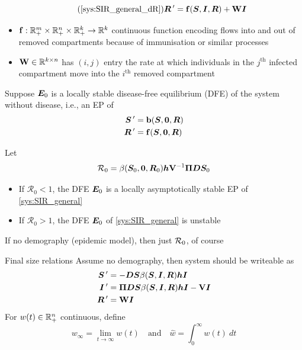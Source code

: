\documentclass[aspectratio=169]{beamer}\usepackage[]{graphicx}\usepackage[]{xcolor}
\begin{document}
\begin{frame}
\begin{equation}\tag{\ref{sys:SIR_general_dR}}
\bR\pprime = \mathbf{f}(\bS,\bI,\bR)+\mathbf{W}\bI
\end{equation}
\begin{itemize}
\item $\mathbf{f}:\mathbb{R}_+^m\times\mathbb{R}_+^n\times\mathbb{R}_+^k\to \mathbb{R}^k$ continuous function encoding flows into and out of removed compartments because of immunisation or similar processes
\item $\mathbf{W}\in\mathbb{R}^{k\times n}$ has $(i,j)$ entry the rate at which individuals in the $j^{\textrm{th}}$ infected compartment move into the $i^{\textrm{th}}$ removed compartment
\end{itemize}
\end{frame}



\begin{frame}
Suppose $\bm{E}_0$ is a locally stable disease-free equilibrium (DFE) of the system without disease, i.e., an EP of
\begin{align*}
\bS\pprime &= \mathbf{b}(\bS,\b0,\bR) \\
\bR\pprime &= \mathbf{f}(\bS,\b0,\bR) \\
\end{align*}

\begin{theorem}
Let
\begin{equation}\label{eq:R0_final_size_method}
\mathcal{R}_0 = 
\beta(\bS_0,\b0,\bR_0)
\bh\mathbf{V}^{-1}
\bPi\bD\bS_0
\end{equation}
\begin{itemize}
\item If $\mathcal{R}_0<1$, the DFE $\bm{E}_0$ is a locally asymptotically stable EP of \eqref{sys:SIR_general}
\item If $\mathcal{R}_0>1$, the DFE $\bm{E}_0$ of \eqref{sys:SIR_general} is unstable
\end{itemize}
\end{theorem}
\vfill
If no demography (epidemic model), then just $\mathcal{R}_0$, of course
\end{frame}  

\begin{frame}{Final size relations}
Assume no demography, then system should be writeable as
\begin{subequations}
\begin{align}
\bm{S}\,' &= -\bm{D}\bm{S}\beta(\bm{S},\bm{I},\bm{R})\bm{h}\bm{I}  \label{sys:SIR_epi_dS} \\
\bm{I}\,' &= \bm{\Pi}\bm{D}\bm{S}\beta(\bm{S},\bm{I},\bm{R})\bm{h}\bm{I}-\mathbf{V}\bm{I} 
\label{sys:SIR_epi_dI} \\
\bm{R}\,' &= \mathbf{W}\bm{I}
\label{sys:SIR_epi_dR} 
\end{align}
\end{subequations}
\vfill
For $w(t)\in\mathbb{R}_+^n$ continuous, define
$$
w_\infty = \lim_{t\to\infty}w(t)\quad\text{and}\quad
\hat{w}=\int_0^\infty w(t)\ dt
$$
\end{frame}  
\end{document}
